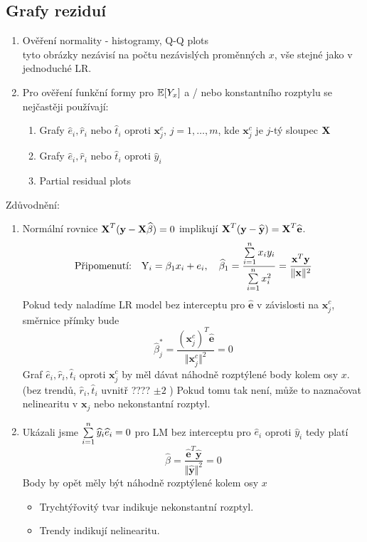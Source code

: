 \subsection{Grafy reziduí}
\begin{enumerate}
\item Ověření normality - histogramy, Q-Q plots \\
tyto obrázky nezávisí na počtu nezávislých proměnných $ x $, vše stejné jako v jednoduché LR.
\item Pro ověření funkční formy pro $ \mathbb{E} [ Y_x ] $ a / nebo konstantního rozptylu se nejčastěji používají:
\begin{enumerate}
\item Grafy $ \widehat{e}_i , \widehat{r}_i $ nebo $ \widehat{t}_i $ oproti $ \textbf{x}_j^c $, $ j = 1, \dots , m $, kde $ \textbf{x}_j^c $ je $ j $-tý sloupec $ \textbf{X} $
\item  Grafy $ \widehat{e}_i , \widehat{r}_i $ nebo $ \widehat{t}_i $ oproti $ \widehat{y}_i $
\item Partial residual plots
\end{enumerate}
\end{enumerate}

\begin{remark}
Zdůvodnění:
\begin{enumerate}
\item Normální rovnice $ \textbf{X} ^{T} ( \textbf{y} - \textbf{X} \widehat{\beta} ) = 0 $ implikují $ \textbf{X} ^{T} ( \textbf{y} - \widehat{\textbf{y}}) = \textbf{X} ^T \widehat{\textbf{e}} $.
$$
 \text{Připomenutí:} \quad \text{Y}_i = \beta_1 x_i + e_i , \quad \widehat{\beta}_1 = \dfrac{\sum\limits_{i=1}^{n} x_i y_i}{\sum\limits_{i=1}^{n} x_i^{2}} = \frac{\textbf{x}^{T}\textbf{y}}{\Vert \textbf{x} \Vert ^2 }
$$
Pokud tedy naladíme LR model bez interceptu pro $ \widehat{\textbf{e}} $ v závislosti na $ \textbf{x}_j^c $, směrnice přímky bude
$$
  \widehat{\beta}_j^* = \frac{(\textbf{x}_j^c)^T \widehat{\textbf{e}}}{\Vert \textbf{x}_j^c \Vert ^2} = 0
$$
Graf $ \widehat{e}_i , \widehat{r}_i , \widehat{t}_i $ oproti $ \textbf{x}_j^c $ by měl dávat náhodně rozptýlené body kolem osy $ x $. (bez trendů, $  \widehat{r}_i , \widehat{t}_i $ uvnitř ???? $\pm 2$ )
Pokud tomu tak není, může to naznačovat nelinearitu v $ \textbf{x}_j $ nebo nekonstantní rozptyl.
\item Ukázali jsme $ \sum\limits_{i=1}^{n} \widehat{y}_i \widehat{e}_i = 0 $ pro LM bez interceptu pro $ \widehat{e}_i $ oproti $ \widehat{y}_i $ tedy platí
$$
  \widehat{\beta} = \frac{\widehat{\textbf{e}}^T \widehat{\textbf{y}}}{\Vert \widehat{\textbf{y}} \Vert ^2} = 0
$$
Body by opět měly být náhodně rozptýlené kolem osy $ x $
\begin{itemize}
\item Trychtýřovitý tvar indikuje nekonstantní rozptyl.
\item Trendy indikují nelinearitu.
\end{itemize}
\end{enumerate}	
\end{remark}

